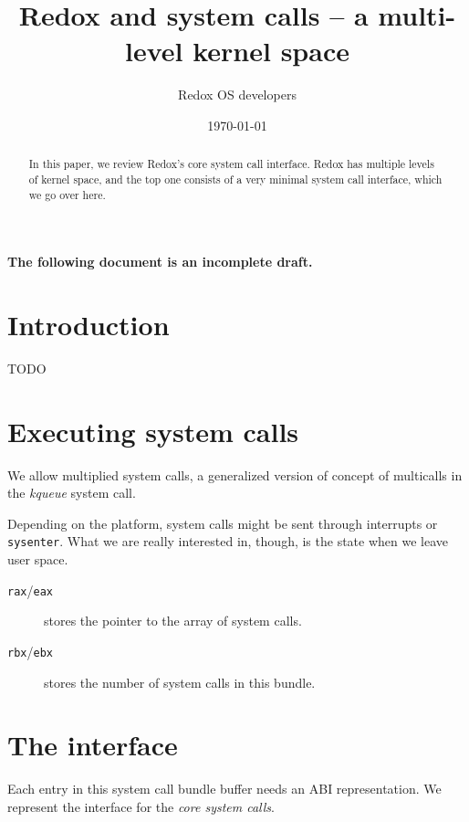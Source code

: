 \documentclass[11pt]{article}
\title{Redox and system calls -- a multi-level kernel space}
\author{Redox OS developers}
\date{\today}
\begin{document}
    \maketitle


    \begin{titlepage}
        \centering \huge\bfseries The following document is an incomplete draft.
    \end{titlepage}


    \maketitle

    \begin{abstract}
        In this paper, we review Redox's core system call interface. Redox has
        multiple levels of kernel space, and the top one consists of a very
        minimal system call interface, which we go over here.
    \end{abstract}

    \section{Introduction}
    TODO

    \section{Executing system calls}
    We allow multiplied system calls, a generalized version of concept of
    multicalls in the \emph{kqueue} system call.

    Depending on the platform, system calls might be sent through interrupts or
    \texttt{sysenter}. What we are really interested in, though, is the state
    when we leave user space.

    \begin{description}
        \item [\texttt{rax}/\texttt{eax}] stores the pointer to the array of system calls.
        \item [\texttt{rbx}/\texttt{ebx}] stores the number of system calls in
            this bundle.
    \end{description}

    \section{The interface}
    Each entry in this system call bundle buffer needs an ABI representation.
    We represent the interface for the \emph{core system calls}.
\end{document}
